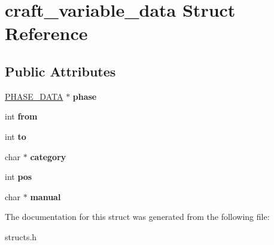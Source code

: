 \hypertarget{structcraft__variable__data}{\section{craft\-\_\-variable\-\_\-data Struct Reference}
\label{structcraft__variable__data}
}
\subsection*{Public Attributes}
\begin{DoxyCompactItemize}
\item 
\hypertarget{structcraft__variable__data_a3da2e20973184026efacb4d2f0f36ed2}{\hyperlink{structphase__data}{P\-H\-A\-S\-E\-\_\-\-D\-A\-T\-A} $\ast$ {\bfseries phase}}\label{structcraft__variable__data_a3da2e20973184026efacb4d2f0f36ed2}

\item 
\hypertarget{structcraft__variable__data_a0cf8d84a9dcd5e2625fa3aabddf0dc42}{int {\bfseries from}}\label{structcraft__variable__data_a0cf8d84a9dcd5e2625fa3aabddf0dc42}

\item 
\hypertarget{structcraft__variable__data_a15587e434f5e1f620962ec72df09e4df}{int {\bfseries to}}\label{structcraft__variable__data_a15587e434f5e1f620962ec72df09e4df}

\item 
\hypertarget{structcraft__variable__data_a01b35fe228e246e9a05235efdaf1ae63}{char $\ast$ {\bfseries category}}\label{structcraft__variable__data_a01b35fe228e246e9a05235efdaf1ae63}

\item 
\hypertarget{structcraft__variable__data_a022022598a25d68e32baf8d008f151ee}{int {\bfseries pos}}\label{structcraft__variable__data_a022022598a25d68e32baf8d008f151ee}

\item 
\hypertarget{structcraft__variable__data_a4ecbffa13a781844c44000beeb62a420}{char $\ast$ {\bfseries manual}}\label{structcraft__variable__data_a4ecbffa13a781844c44000beeb62a420}

\end{DoxyCompactItemize}


The documentation for this struct was generated from the following file\-:\begin{DoxyCompactItemize}
\item 
structs.\-h\end{DoxyCompactItemize}
